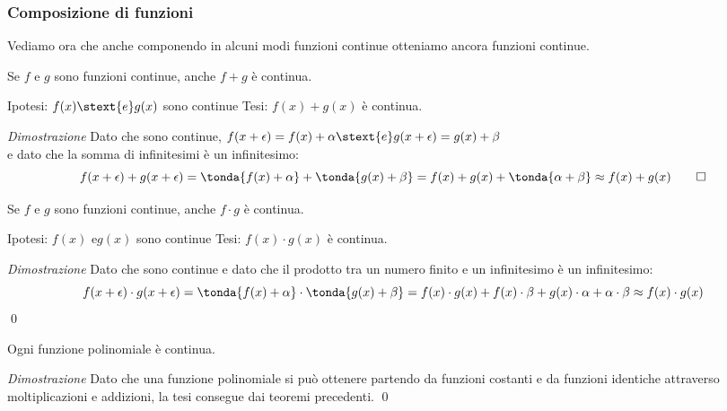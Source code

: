 \subsubsection{Composizione di funzioni}
\label{subsubsec:cont_composizionefunzioni}

Vediamo ora che anche componendo in alcuni modi funzioni continue otteniamo 
ancora funzioni continue.

\begin{teorema}
Se \(f\) e \(g\) sono funzioni continue, anche \(f+g\) è continua.
\end{teorema}

\noindent Ipotesi: 
\(f(x) \stext{e} g(x)\) sono continue
\tab Tesi: 
\(f(x)+g(x)\) è continua.

\emph{Dimostrazione}
Dato che sono continue, 
\(f(x+\epsilon) = f(x)+\alpha \stext{ e } g(x+\epsilon) = g(x)+\beta\) \\
e dato che la somma di infinitesimi è un infinitesimo:
\[f(x+\epsilon) + g(x+\epsilon) = 
\tonda{f(x)+\alpha} + \tonda{g(x)+\beta} = 
f(x)+g(x)+\tonda{\alpha + \beta} \approx f(x)+g(x) \qed\]

\begin{teorema}
Se \(f\) e \(g\) sono funzioni continue, anche \(f \cdot g\) è continua.
\end{teorema}

\noindent Ipotesi: 
\(f(x) \text{ e} g(x)\) sono continue
\tab Tesi: 
\(f(x) \cdot g(x)\) è continua.

\emph{Dimostrazione}
Dato che sono continue e dato che il prodotto tra un numero finito e un 
infinitesimo è un infinitesimo: 
\[f(x+\epsilon) \cdot g(x+\epsilon) = 
\tonda{f(x)+\alpha} \cdot \tonda{g(x)+\beta} = 
f(x) \cdot g(x) + f(x) \cdot \beta + g(x) \cdot \alpha + \alpha \cdot \beta
\approx f(x) \cdot g(x)\]
\qed

\begin{corollario}
 Ogni funzione polinomiale è continua.
\end{corollario}

\emph{Dimostrazione}
Dato che una funzione polinomiale si può ottenere partendo da funzioni 
costanti e da funzioni identiche attraverso moltiplicazioni e addizioni, 
la tesi consegue dai teoremi precedenti. \qed

